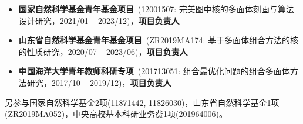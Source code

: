 %
%


{
\fontsize{9.65pt}{\baselineskip}\selectfont

\begin{itemize}[leftmargin=*]
	\item \textbf{国家自然科学基金青年基金项目}~(12001507: 完美图中核的多面体刻画与算法设计研究，2021/01 -- 2023/12)，\textbf{项目负责人}
	\item \textbf{山东省自然科学基金青年基金项目}~(ZR2019MA174: 基于多面体组合方法的核的性质研究，2020/07 -- 2023/06)，\textbf{项目负责人}
	\item \textbf{中国海洋大学青年教师科研专项}~(201713051: 组合最优化问题的组合多面体方法研究，2017/10 -- 2019/12)，\textbf{项目负责人}
\end{itemize}
}
\iffalse
 \begin{tabular}{rl}	
	2021 -- 2023 & %
	{\hspace{-.5em}\textbf{国家自然科学基金青年基金项目}}~(12001507: 完美图中核的多面体刻画与算法设计研究)，\textbf{项目负责人}\\
	2020 -- 2023 & %
	{\hspace{-.5em}\textbf{山东省自然科学基金青年基金项目}}~(ZR2019MA174: 基于多面体组合方法的核的性质研究)，\textbf{项目负责人}\\
	2017 -- 2019 & %
	{\hspace{-.5em}\textbf{中国海洋大学青年教师科研专项}}~(201713051: 组合最优化问题的组合多面体方法研究)，\textbf{项目负责人}
\end{tabular}
\fi

另参与国家自然科学基金2项(11871442, 11826030)，山东省自然科学基金1项(ZR2019MA052)，中央高校基本科研业务费1项(201964006)。